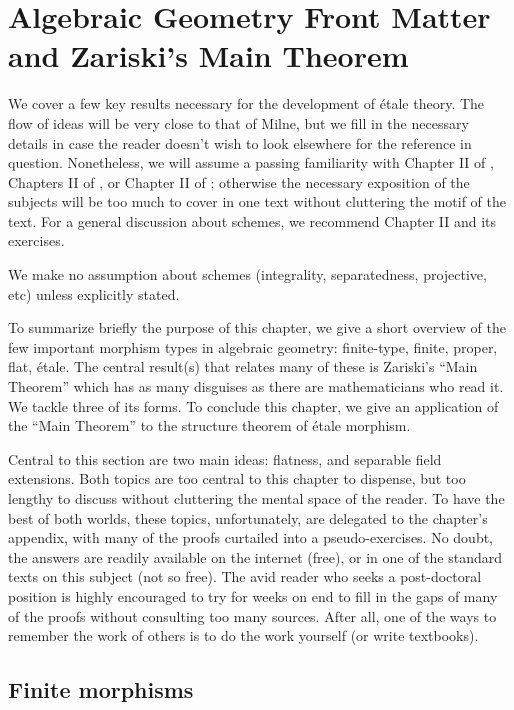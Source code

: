 \chapter{Algebraic Geometry Front Matter and Zariski's Main 
Theorem}
\label{sect_zariski}

\renewcommand{\O}{\mathcal{O}}

We cover a few key results necessary for the development of 
\'etale theory. The flow of ideas will be very close to that of 
Milne, but we fill in the necessary details in case the reader 
doesn't wish to look elsewhere for the reference in question. 
Nonetheless, we will assume a passing familiarity with Chapter II of 
\cite{Hart}, Chapters II of \cite{Liu}, or Chapter II of 
\cite{Mum}; otherwise the necessary exposition of the subjects 
will be too much to cover in one text without cluttering the motif 
of the text. For a general discussion about schemes, we recommend 
\cite{Hart} Chapter II and its exercises.

We make no assumption about schemes (integrality, separatedness, 
projective, etc) unless explicitly stated. 

To summarize briefly the purpose of this chapter, we give a short 
overview of the few important morphism types in algebraic 
geometry: finite-type, finite, proper, flat, \'etale. The central 
result(s) that relates many of these is Zariski's ``Main Theorem'' 
which has as many disguises as there are mathematicians who read 
it. We tackle three of its forms. To conclude this chapter, we 
give an application of the ``Main Theorem'' to the structure 
theorem of \'etale morphism.

Central to this section are two main ideas: flatness, and 
separable field extensions. Both topics are too central to this
chapter to dispense, but too lengthy to discuss without cluttering
the mental space of the reader. To have the best of both worlds, 
these topics, unfortunately, are delegated to the chapter's 
appendix, with many of the proofs curtailed into a 
pseudo-exercises. No doubt, the answers are readily available on 
the internet (free), or in one of the standard texts on this 
subject (not so free). The avid reader who seeks a post-doctoral 
position is highly encouraged to try for weeks on end to fill in 
the gaps of many of the proofs without consulting too many 
sources. After all, one of the ways to remember the work of others 
is to do the work yourself (or write textbooks).

\section{Finite morphisms}

